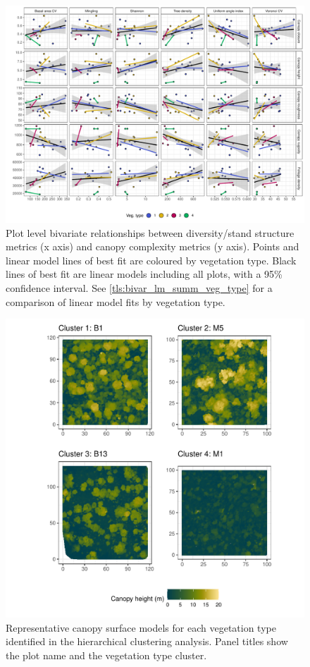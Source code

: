 \begin{refsection}
\begin{landscape}
\begin{figure}
	\includegraphics[width=0.8\linewidth]{img/bivar_plot}
	\caption[Bivariate plots comparing diversity, stand structure and canopy complexity]{Plot level bivariate relationships between diversity/stand structure metrics (x axis) and canopy complexity metrics (y axis). Points and linear model lines of best fit are coloured by vegetation type. Black lines of best fit are linear models including all plots, with a 95\% confidence interval. See \autoref{tls:bivar_lm_summ_veg_type} for a comparison of linear model fits by vegetation type.}
	\label{tls:plot_bivar}
\end{figure}
\end{landscape}


\begin{figure}
	\includegraphics[width=\linewidth]{img/veg_type_tile}
	\caption[Canopy surface models]{Representative canopy surface models for each vegetation type identified in the hierarchical clustering analysis. Panel titles show the plot name and the vegetation type cluster.}
	\label{tls:veg_type_tile}
\end{figure}


\end{refsection}
